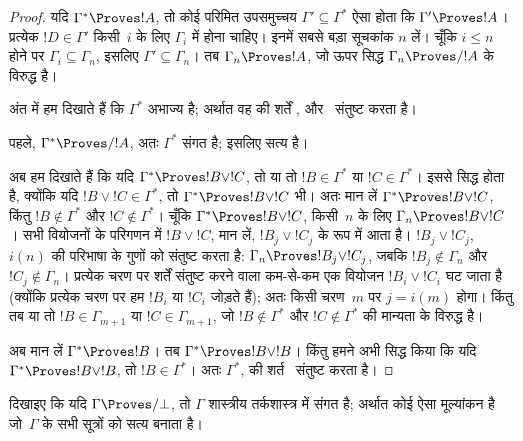 \documentclass[../../../include/open-logic-section]{subfiles}
\begin{document}
\begin{proof}
  यदि $\Gamma^* \Proves !A$, तो कोई परिमित उपसमुच्चय
  $\Gamma' \subseteq \Gamma^*$ ऐसा होता कि $\Gamma' \Proves !A$। प्रत्येक
  $!D \in \Gamma'$ किसी~$i$ के लिए $\Gamma_i$ में होना चाहिए। इनमें सबसे
  बड़ा सूचकांक $n$ लें। चूँकि $i \le n$ होने पर
  $\Gamma_i \subseteq \Gamma_n$, इसलिए $\Gamma' \subseteq \Gamma_n$। तब
  $\Gamma_n \Proves !A$, जो ऊपर सिद्ध $\Gamma_n \Proves/ !A$ के विरुद्ध
  है।

  अंत में हम दिखाते हैं कि $\Gamma^*$ अभाज्य है; अर्थात वह
   की शर्तें ,
   और~ संतुष्ट करता है।

  पहले, $\Gamma^* \Proves/ !A$, अतः $\Gamma^*$ संगत है; इसलिए
   सत्य है।

  अब हम दिखाते हैं कि यदि $\Gamma^* \Proves !B \lor !C$, तो या तो
  $!B \in \Gamma^*$ या $!C \in \Gamma^*$। इससे 
  सिद्ध होता है, क्योंकि यदि $!B \lor !C \in \Gamma^*$, तो
  $\Gamma^* \Proves !B \lor !C$ भी। अतः मान लें
  $\Gamma^* \Proves !B \lor !C$, किंतु $!B \notin \Gamma^*$ और
  $!C \notin \Gamma^*$। चूँकि $\Gamma^* \Proves !B \lor !C$, किसी~$n$
  के लिए $\Gamma_n \Proves !B \lor !C$। सभी वियोजनों के परिगणन में
  $!B \lor !C$, मान लें, $!B_j \lor !C_j$ के रूप में आता है।
  $!B_j \lor !C_j$, $i(n)$ की परिभाषा के गुणों को संतुष्ट करता है:
  $\Gamma_n \Proves !B_j \lor !C_j$, जबकि
  $!B_j \notin \Gamma_n$ और $!C_j \notin \Gamma_n$। प्रत्येक चरण पर
  शर्तें संतुष्ट करने वाला कम-से-कम एक वियोजन $!B_i \lor !C_i$ घट जाता है
  (क्योंकि प्रत्येक चरण पर हम $!B_i$ या $!C_i$ जोड़ते हैं); अतः किसी
  चरण~$m$ पर $j = i(m)$ होगा। किंतु तब या तो
  $!B \in \Gamma_{m+1}$ या $!C \in \Gamma_{m+1}$, जो
  $!B \notin \Gamma^*$ और $!C \notin \Gamma^*$ की मान्यता के विरुद्ध है।

  अब मान लें $\Gamma^* \Proves !B$। तब
  $\Gamma^* \Proves !B \lor !B$। किंतु हमने अभी सिद्ध किया कि यदि
  $\Gamma^* \Proves !B \lor !B$, तो $!B \in \Gamma^*$। अतः $\Gamma^*$,
   की शर्त~ संतुष्ट करता है।
\end{proof}

\begin{prob}
दिखाइए कि यदि $\Gamma \Proves/ \bot$, तो $\Gamma$ शास्त्रीय तर्कशास्त्र में
संगत है; अर्थात कोई ऐसा मूल्यांकन है जो~$\Gamma$ के सभी सूत्रों को सत्य
बनाता है।
\end{prob}
\end{document}
